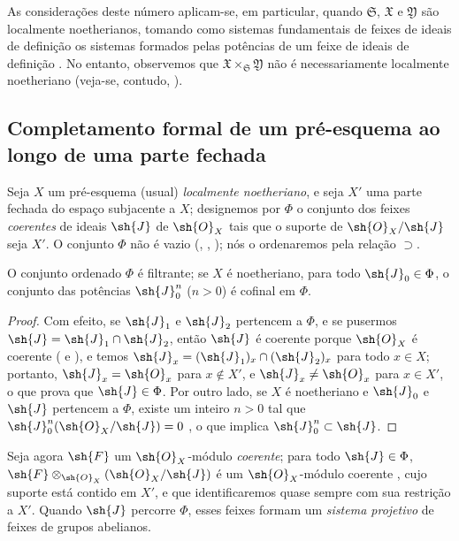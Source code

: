\documentclass[oneside]{amsart}
\let\EGAOriginalLabel\label
\renewcommand{\label}[1]{\phantomsection\EGAOriginalLabel{#1}}
\begin{document}
\begin{env}[10.7.4]
As considerações deste número aplicam-se, em particular, quando $\mathfrak{S}$, $\mathfrak{X}$ e $\mathfrak{Y}$ são localmente noetherianos, tomando como sistemas fundamentais de feixes de ideais de definição os sistemas formados pelas potências de um feixe de ideais de definição .
No entanto, observemos que $\mathfrak{X}\times_\mathfrak{S}\mathfrak{Y}$ não é necessariamente localmente noetheriano (veja-se, contudo, ).
\end{env}

\subsection{Completamento formal de um pré-esquema ao longo de uma parte fechada}
\label{subsection:I.10.8}

\begin{env}[10.8.1]
\label{I.10.8.1}
Seja $X$ um pré-esquema (usual) \emph{localmente noetheriano}, e seja $X'$ uma parte fechada do espaço subjacente a $X$; designemos por $\Phi$ o conjunto dos feixes \emph{coerentes} de ideais $\sh{J}$ de $\sh{O}_X$ tais que o suporte de $\sh{O}_X/\sh{J}$ seja $X'$.
O conjunto $\Phi$ não é vazio (, , ); nós o ordenaremos pela relação $\supset$.
\end{env}

\begin{lemma}[10.8.2]
\label{I.10.8.2}
O conjunto ordenado $\Phi$ é filtrante; se $X$ é noetheriano, para todo $\sh{J}_0\in\Phi$, o conjunto das potências $\sh{J}_0^n$ ($n>0$) é cofinal em $\Phi$.
\end{lemma}

\begin{proof}
Com efeito, se $\sh{J}_1$ e $\sh{J}_2$ pertencem a $\Phi$, e se pusermos $\sh{J}=\sh{J}_1\cap\sh{J}_2$, então $\sh{J}$ é coerente porque $\sh{O}_X$ é coerente ( e ), e temos $\sh{J}_x=(\sh{J}_1)_x\cap(\sh{J}_2)_x$ para todo $x\in X$; portanto, $\sh{J}_x=\sh{O}_x$ para $x\not\in X'$, e $\sh{J}_x\neq\sh{O}_x$ para $x\in X'$, o que prova que $\sh{J}\in\Phi$.
Por outro lado, se $X$ é noetheriano e $\sh{J}_0$ e $\sh{J}$ pertencem a $\Phi$, existe um inteiro $n>0$ tal que $\sh{J}_0^n(\sh{O}_X/\sh{J})=0$ , o que implica $\sh{J}_0^n\subset\sh{J}$.
\end{proof}

\begin{env}[10.8.3]
\label{I.10.8.3}
Seja agora $\sh{F}$ um $\sh{O}_X$-módulo \emph{coerente}; para todo $\sh{J}\in\Phi$, $\sh{F}\otimes_{\sh{O}_X}(\sh{O}_X/\sh{J})$ é um $\sh{O}_X$-módulo coerente , cujo suporte está contido em $X'$, e que identificaremos quase sempre com sua restrição a $X'$.
Quando $\sh{J}$ percorre $\Phi$, esses feixes formam um \emph{sistema projetivo} de feixes de grupos abelianos.
\end{env}
\end{document}
